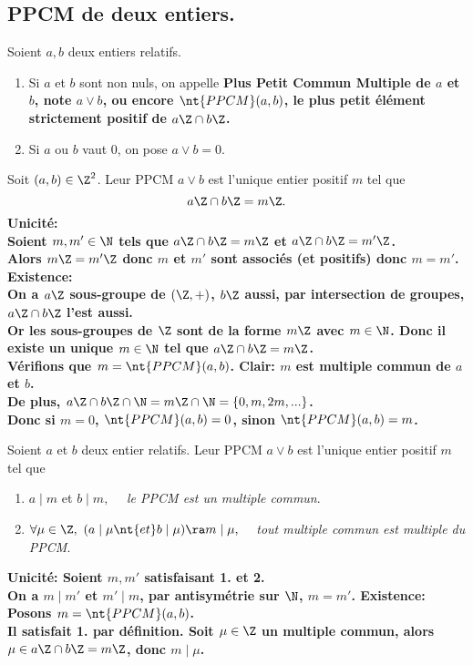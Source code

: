\documentclass[11pt]{article}
\newcommand*{\PPCM}{\nt{PPCM}}
\begin{document}
\subsection{PPCM de deux entiers.}

\begin{defi}{}{}
    Soient $a,b$ deux entiers relatifs.
    \begin{enumerate}[topsep=0pt,itemsep=-0.9 ex]
        \item Si $a$ et $b$ sont non nuls, on appelle \bf{Plus Petit Commun Multiple} de $a$ et $b$, note $a\lor b$, ou encore $\PPCM(a,b)$, le plus petit élément strictement positif de $a\Z\cap b\Z$.
        \item Si $a$ ou $b$ vaut 0, on pose $a\lor b=0$.
    \end{enumerate}
\end{defi}

\begin{prop}{}{}
    Soit $(a,b)\in\Z^2$. Leur PPCM $a\lor b$ est l'unique entier positif $m$ tel que
    \begin{equation*}
        a\Z \cap b\Z = m\Z.
    \end{equation*}
    \tcblower
    \bf{Unicité:}\\
    Soient $m,m'\in\N$ tels que $a\Z\cap b\Z=m\Z$ et $a\Z\cap b\Z=m'\Z$.\\
    Alors $m\Z = m'\Z$ donc $m$ et $m'$ sont associés (et positifs) donc $m=m'$.\n
    \bf{Existence:}\\
    On a $a\Z$ sous-groupe de $(\Z,+)$, $b\Z$ aussi, par intersection de groupes, $a\Z\cap b\Z$ l'est aussi.\\
    Or les sous-groupes de $\Z$ sont de la forme $m\Z$ avec $m\in\N$. Donc il existe un unique $m\in\N$ tel que $a\Z\cap b\Z=m\Z$.\\
    Vérifions que $m=\PPCM(a,b)$. Clair: $m$ est multiple commun de $a$ et $b$.\\
    De plus, $a\Z\cap b\Z\cap\N=m\Z\cap\N=\{0,m,2m,...\}$.\\
    Donc si $m=0$, $\PPCM(a,b)=0$, sinon $\PPCM(a,b)=m$. 
\end{prop}

\begin{thm}{}{}
    Soient $a$ et $b$ deux entier relatifs. Leur PPCM $a\lor b$ est l'unique entier positif $m$ tel que
    \begin{enumerate}[topsep=0pt,itemsep=-0.9 ex]
        \item $a\mid m$ et $b\mid m,\quad$ \emph{le PPCM est un multiple commun}.
        \item $\forall \mu \in \Z,~(a\mid\mu \nt{ et } b \mid \mu) \ra m \mid \mu,\quad$ \emph{tout multiple commun est multiple du PPCM}.
    \end{enumerate}
    \tcblower
    \bf{Unicité:} Soient $m,m'$ satisfaisant 1. et 2.\\
    On a $m\mid m'$ et $m'\mid m$, par antisymétrie sur $\N$, $m=m'$.\n
    \bf{Existence:} Posons $m=\PPCM(a,b)$.\\
    Il satisfait 1. par définition. Soit $\mu\in\Z$ un multiple commun, alors $\mu\in a\Z\cap b\Z=m\Z$, donc $m\mid \mu$.
\end{thm}
\end{document}
